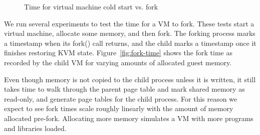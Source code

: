 \begin{figure*}[t]
  \center

  \label{fig:fork-time}
  \caption{Time for virtual machine cold start vs. fork}
  \label{fig:boot-time}
\end{figure*}

We run several experiments to test the time for a VM to fork. These tests start
a virtual machine, allocate some memory, and then fork.  The forking process
marks a timestamp when its fork() call returns, and the child marks a timestamp
once it finishes restoring KVM state.  Figure~\ref{fig:fork-time} shows the
fork time as recorded by the child VM for varying amounts of allocated guest
memory.

Even though memory is not copied to the child process unless it is written, it
still takes time to walk through the parent page table and mark shared memory
as read-only, and generate page tables for the child process. For this reason
we expect to see fork times scale roughly linearly with the amount of memory
allocated pre-fork. Allocating more memory simulates a VM with more programs
and libraries loaded.

